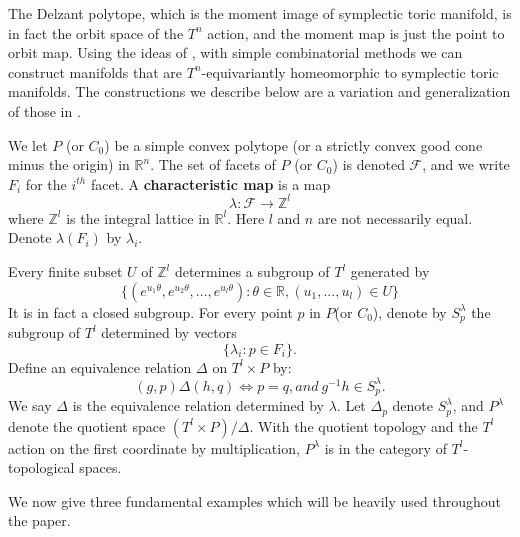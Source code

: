 \documentclass[12pt]{amsart}
\theoremstyle{definition}
\numberwithin{equation}{section}
\begin{document}
The Delzant polytope, which is the moment image of symplectic toric
manifold, is in fact the orbit space of the $T^n$ action, and the
moment map is just the point to orbit map. Using the ideas of
\cite{DJ}, with simple combinatorial methods we can construct
manifolds that are $T^n$-equivariantly homeomorphic to symplectic
toric manifolds. The constructions we describe below are a variation
and generalization of those in \cite{DJ}.

We let $P$ (or $C_{0}$) be a simple convex polytope (or a strictly
convex good cone minus the origin) in ${{\mathbb{R}}}^n$. The set of facets of
$P$ (or $C_{0}$) is denoted ${{\mathcal{F}}}$, and we write $F_{i}$ for the
$i^{th}$ facet. A {\bf characteristic map} is a map
\begin{equation*}
\lambda: {{\mathcal{F}}}\rightarrow {{\mathbb{Z}}}^l
 \end{equation*}
 where ${{\mathbb{Z}}}^l$ is the integral lattice in ${{\mathbb{R}}}^l$. Here $l$
and $n$ are not necessarily equal. Denote $\lambda(F_{i})$ by
$\lambda_{i}$.

Every finite subset $U$ of ${{\mathbb{Z}}}^l$ determines a subgroup of $T^l$
generated by
\begin{equation*}\{(e^{u_{1}\theta},e^{u_{2}\theta},...,e^{u_{l}\theta}):\theta\in
{{\mathbb{R}}},(u_{1},...,u_{l})\in U\}\end{equation*} It is in fact a closed
subgroup. For every point $p$ in $P$(or $C_{0}$), denote by
$S^{\lambda}_{p}$ the subgroup of $T^l$ determined by vectors
\begin{equation*}\{\lambda_{i}:p\in F_{i}\}.\end{equation*}
Define an equivalence relation $\Delta$ on $T^{l}\times P$ by:
\begin{equation}
(g,p)\Delta (h,q) \Leftrightarrow  p=q, and\ g^{-1}h\in
S^{\lambda}_{p}.
\end{equation}
 We say $\Delta$ is the equivalence relation
determined by $\lambda$. Let $\Delta_{p}$ denote $S^{\lambda}_{p}$,
and $P^{\lambda}$ denote the quotient space $(T^{l}\times
P)/\Delta$. With the quotient topology and the $T^{l}$ action on the
first coordinate by multiplication, $P^{\lambda}$ is in the category
of $T^{l}$-topological spaces.

We now give three fundamental examples which will be heavily used
throughout the paper.
\end{document}
